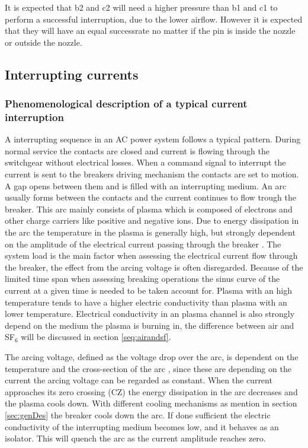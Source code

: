 \documentclass[10pt,a4paper]{article} %
\begin{document}
It is expected that b2 and c2 will need a higher pressure than b1 and c1 to perform a successful interruption, due to the lower airflow. However it is expected that they will have an equal successrate no matter if the pin is inside the nozzle or outside the nozzle.
\newpage
\subsection{Interrupting currents} 
\subsubsection{Phenomenological description of a typical current interruption} \label{sec:InterruptCurrent}
A interrupting sequence in an AC power system follows a typical pattern. During normal service the contacts are closed and current is flowing through the switchgear without electrical losses. When a command signal to interrupt the current is sent to the breakers driving mechanism the contacts are set to motion. A gap opens between them and is filled with an interrupting medium. An arc usually forms between the contacts and the current continues to flow trough the breaker. This arc mainly consists of plasma which is composed of electrons and other charge carriers like positive and negative ions. Due to energy dissipation in the arc the temperature in the plasma is generally high, but strongly dependent on the amplitude of the electrical current passing through the breaker \cite{bib:HVEbreak}. The system load is the main factor when assessing the electrical current flow through the breaker, the effect from the arcing voltage is often disregarded. Because of the limited time span when assessing breaking operations the sinus curve of the current at a given time is needed to be taken account for. Plasma with an high temperature tends to have a higher electric conductivity than plasma with an lower temperature. Electrical conductivity in an plasma channel is also strongly depend on the medium the plasma is burning in, the difference between air and SF${_6}$ will be discussed in section \ref{seq:airandsf}.

The arcing voltage, defined as the voltage drop over the arc, is dependent on the temperature and the cross-section of the arc \cite{bib:HVEbreak}, since these are depending on the current the arcing voltage can be regarded as constant. When the current approaches its zero crossing (CZ) the energy dissipation in the arc decreases and the plasma cools down. With different cooling mechanisms as mention in section \ref{sec:genDes} the breaker cools down the arc. If done sufficient the electric conductivity of the interrupting medium becomes low, and it behaves as an isolator. This will quench the arc as the current amplitude reaches zero.
\end{document}
